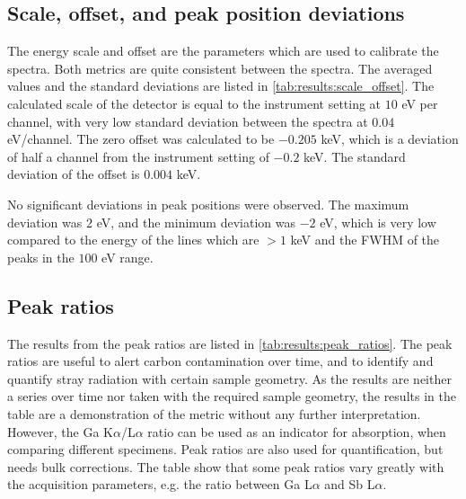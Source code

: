 


\subsection{Scale, offset, and peak position deviations}
\label{results:scaleoffset}

The energy scale and offset are the parameters which are used to calibrate the spectra.
Both metrics are quite consistent between the spectra.
The averaged values and the standard deviations are listed in \cref{tab:results:scale_offset}.
The calculated scale of the detector is equal to the instrument setting at $10$ eV per channel, with very low standard deviation between the spectra at $0.04$ eV/channel.
The zero offset was calculated to be $-0.205$ keV, which is a deviation of half a channel from the instrument setting of $-0.2$ keV.
The standard deviation of the offset is $0.004$ keV.




No significant deviations in peak positions were observed.
The maximum deviation was $2$ eV, and the minimum deviation was $-2$ eV, which is very low compared to the energy of the lines which are $> 1$ keV and the FWHM of the peaks in the $100$ eV range.







\subsection{Peak ratios}
\label{results:peak_ratios}

The results from the peak ratios are listed in \cref{tab:results:peak_ratios}.
The peak ratios are useful to alert carbon contamination over time, and to identify and quantify stray radiation with certain sample geometry.
As the results are neither a series over time nor taken with the required sample geometry, the results in the table are a demonstration of the metric without any further interpretation.
However, the Ga K$\alpha$/L$\alpha$ ratio can be used as an indicator for absorption, when comparing different specimens.
Peak ratios are also used for quantification, but needs bulk corrections.
The table show that some peak ratios vary greatly with the acquisition parameters, e.g. the ratio between Ga L$\alpha$ and Sb L$\alpha$.


